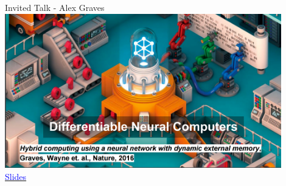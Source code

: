 \documentclass[]{beamer}
\begin{document}

%
%
%
%

\begin{frame}{Invited Talk - Alex Graves}
\centering
\includegraphics[width=0.9\textwidth]{figures/graves-nature} \\
\href{http://iclr.cc/lib/exe/fetch.php?media=iclr2017:graves\_iclr2017.pdf}{\textcolor{blue}{Slides}}
\end{frame}
\end{document}
